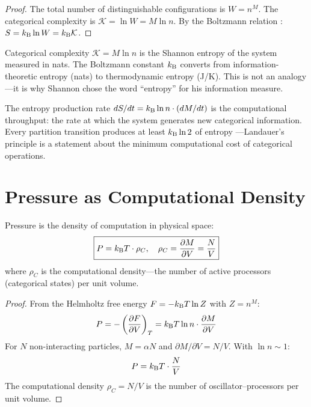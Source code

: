 \begin{proof}
The total number of distinguishable configurations is $W = n^M$. The categorical complexity is $\mathcal{K} = \ln W = M \ln n$. By the Boltzmann relation \cite{boltzmann1877}: $S = k_{\mathrm{B}} \ln W = k_{\mathrm{B}} \mathcal{K}$.
\end{proof}

\begin{remark}
Categorical complexity $\mathcal{K} = M \ln n$ is the Shannon entropy \cite{shannon1948} of the system measured in nats. The Boltzmann constant $k_{\mathrm{B}}$ converts from information-theoretic entropy (nats) to thermodynamic entropy (J/K). This is not an analogy---it is why Shannon chose the word ``entropy'' for his information measure.
\end{remark}

\begin{corollary}
The entropy production rate $dS/dt = k_{\mathrm{B}} \ln n \cdot (dM/dt)$ is the computational throughput: the rate at which the system generates new categorical information. Every partition transition produces at least $k_{\mathrm{B}} \ln 2$ of entropy \cite{landauer1961}---Landauer's principle is a statement about the minimum computational cost of categorical operations.
\end{corollary}

\section{Pressure as Computational Density}
\label{sec:pressure_density}

\begin{theorem}
\label{thm:pressure_density}
Pressure is the density of computation in physical space:
\begin{equation}
\boxed{P = k_{\mathrm{B}} T \cdot \rho_C, \quad \rho_C = \frac{\partial M}{\partial V} = \frac{N}{V}}
\end{equation}
where $\rho_C$ is the computational density---the number of active processors (categorical states) per unit volume.
\end{theorem}

\begin{proof}
From the Helmholtz free energy $F = -k_{\mathrm{B}} T \ln Z$ with $Z = n^M$:
\begin{equation}
    P = -\left(\frac{\partial F}{\partial V}\right)_T = k_{\mathrm{B}} T \ln n \cdot \frac{\partial M}{\partial V}
\end{equation}
For $N$ non-interacting particles, $M = \alpha N$ and $\partial M/\partial V = N/V$. With $\ln n \sim 1$:
\begin{equation}
    P = k_{\mathrm{B}} T \cdot \frac{N}{V}
\end{equation}
The computational density $\rho_C = N/V$ is the number of oscillator--processors per unit volume.
\end{proof}

